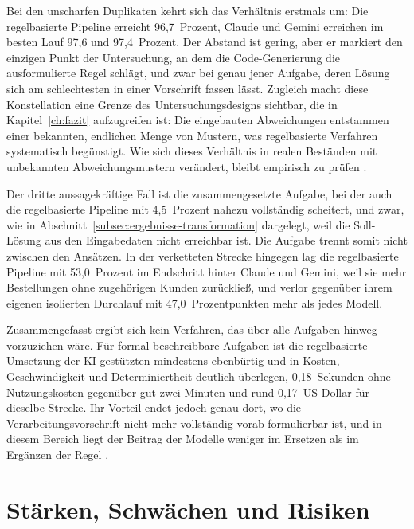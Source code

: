 Bei den unscharfen Duplikaten kehrt sich das Verhältnis erstmals um: Die regelbasierte Pipeline erreicht 96,7~Prozent, Claude und Gemini erreichen im besten Lauf 97,6 und 97,4~Prozent. Der Abstand ist gering, aber er markiert den einzigen Punkt der Untersuchung, an dem die Code-Generierung die ausformulierte Regel schlägt, und zwar bei genau jener Aufgabe, deren Lösung sich am schlechtesten in einer Vorschrift fassen lässt. Zugleich macht diese Konstellation eine Grenze des Untersuchungsdesigns sichtbar, die in Kapitel~\ref{ch:fazit} aufzugreifen ist: Die eingebauten Abweichungen entstammen einer bekannten, endlichen Menge von Mustern, was regelbasierte Verfahren systematisch begünstigt. Wie sich dieses Verhältnis in realen Beständen mit unbekannten Abweichungsmustern verändert, bleibt empirisch zu prüfen \autocite{coteDataCleaningMachine2024,ridzuanReviewDataQuality2024}.

Der dritte aussagekräftige Fall ist die zusammengesetzte Aufgabe, bei der auch die regelbasierte Pipeline mit 4,5~Prozent nahezu vollständig scheitert, und zwar, wie in Abschnitt~\ref{subsec:ergebnisse-transformation} dargelegt, weil die Soll-Lösung aus den Eingabedaten nicht erreichbar ist. Die Aufgabe trennt somit nicht zwischen den Ansätzen. In der verketteten Strecke hingegen lag die regelbasierte Pipeline mit 53,0~Prozent im Endschritt hinter Claude und Gemini, weil sie mehr Bestellungen ohne zugehörigen Kunden zurückließ, und verlor gegenüber ihrem eigenen isolierten Durchlauf mit 47,0~Prozentpunkten mehr als jedes Modell.

Zusammengefasst ergibt sich kein Verfahren, das über alle Aufgaben hinweg vorzuziehen wäre. Für formal beschreibbare Aufgaben ist die regelbasierte Umsetzung der \ac{KI}-gestützten mindestens ebenbürtig und in Kosten, Geschwindigkeit und Determiniertheit deutlich überlegen, 0,18~Sekunden ohne Nutzungskosten gegenüber gut zwei Minuten und rund 0,17~US-Dollar für dieselbe Strecke. Ihr Vorteil endet jedoch genau dort, wo die Verarbeitungsvorschrift nicht mehr vollständig vorab formulierbar ist, und in diesem Bereich liegt der Beitrag der Modelle weniger im Ersetzen als im Ergänzen der Regel \autocite{coteDataCleaningMachine2024,kasireddyRoleAIModern2026}.

\section{Stärken, Schwächen und Risiken}
\label{sec:diskussion}

